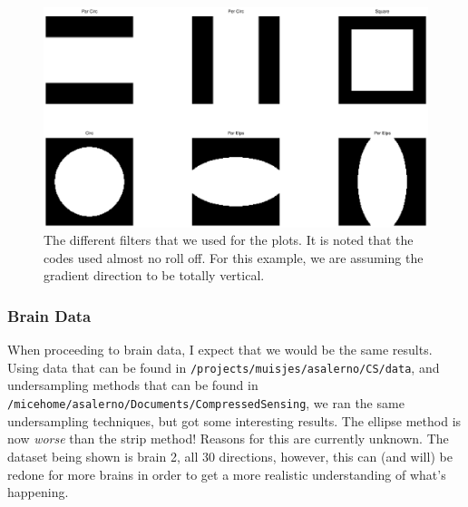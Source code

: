 \documentclass[11 pt]{article}
\begin{document}
      \begin{figure}[!h]
        \centering
        \vspace{0pt}
        \setlength\fboxsep{0pt}
        \setlength\fboxrule{0.5pt}
        \includegraphics[trim = {10mm 0mm 10mm 0mm},clip,scale = 0.4] {Figs/numericalSims/DiffFilts.eps}
        \caption{The different filters that we used for the plots. It is noted that the codes used almost no roll off. For this example, we are assuming the gradient direction to be totally vertical.}
        \label{fig:USFilts}

        \end{figure}
    
      

      \newpage

    \subsubsection{Brain Data}
    
      When proceeding to brain data, I expect that we would be the same results. Using data that can be found in \verb!/projects/muisjes/asalerno/CS/data!, and undersampling methods that can be found in \verb!/micehome/asalerno/Documents/CompressedSensing!, we ran the same undersampling techniques, but got some interesting results. The ellipse method is now \emph{worse} than the strip method! Reasons for this are currently unknown. The dataset being shown is brain 2, all 30 directions, however, this can (and will) be redone for more brains in order to get a more realistic understanding of what's happening.
      
\end{document}
